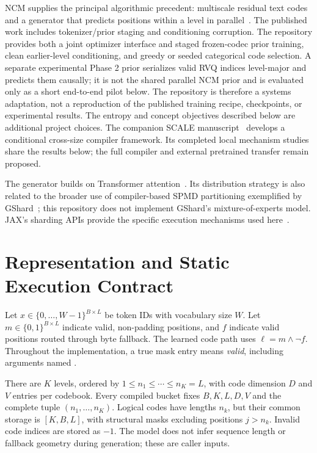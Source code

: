 \documentclass[11pt,a4paper]{article}
\begin{document}
NCM supplies the principal algorithmic precedent: multiscale residual text codes
and a generator that predicts positions within a level in
parallel~\citep{kumbong2026ncm}. The published work includes tokenizer/prior
staging and conditioning corruption. The repository provides both a joint optimizer interface and staged frozen-codec
prior training, clean earlier-level conditioning, and greedy or seeded categorical
code selection. A separate experimental Phase 2 prior serializes valid RVQ
indices level-major and predicts them causally; it is not the shared parallel
NCM prior and is evaluated only as a short end-to-end pilot below. The repository
is therefore a systems adaptation, not a reproduction of the
published training recipe, checkpoints, or experimental results. The entropy
and concept objectives described below are additional project choices. The
companion SCALE manuscript~\citep{scalecompanion} develops a conditional
cross-size compiler framework. Its completed local mechanism studies share the
results below; the full compiler and external pretrained transfer remain proposed.

The generator builds on Transformer attention~\citep{vaswani2017attention}.
Its distribution strategy is also related to the broader use of compiler-based
SPMD partitioning exemplified by GShard~\citep{lepikhin2020gshard}; this repository
does not implement GShard's mixture-of-experts model. JAX's sharding APIs
provide the specific execution mechanisms used here~\citep{jaxsharding,jaxmanual}.

\section{Representation and Static Execution Contract}
\label{sec:contract}
Let \(x\in\{0,\ldots,W-1\}^{B\times L}\) be token IDs with vocabulary size
\(W\). Let \(m\in\{0,1\}^{B\times L}\) indicate valid, non-padding positions,
and \(f\) indicate valid positions routed through byte fallback. The learned
code path uses \(\ell=m\land\neg f\). Throughout the implementation, a true
mask entry means \emph{valid}, including arguments named .

There are \(K\) levels, ordered by
\(1\leq n_1\leq\cdots\leq n_K=L\), with code dimension \(D\) and
\(V\) entries per codebook. Every compiled bucket fixes \(B,K,L,D,V\) and the
complete tuple \((n_1,\ldots,n_K)\). Logical codes have lengths \(n_k\), but
their common storage is \([K,B,L]\), with structural masks excluding positions
\(j>n_k\). Invalid code indices are stored as \(-1\). The model does not infer
sequence length or fallback geometry during generation; these are caller inputs.
\end{document}
